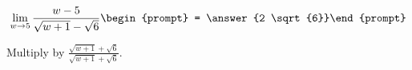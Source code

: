 \documentclass{ximera}
\author{Bart Snapp}
\begin{document}
\begin{exercise}

\[
\lim_{w\to 5 } \frac{w-5}{\sqrt{w+1}-\sqrt{6}}\begin{prompt} = \answer{2 \sqrt{6}}\end{prompt}
\]
\begin{hint}
Multiply by $\frac{\sqrt{w+1}+\sqrt{6}}{\sqrt{w+1}+\sqrt{6}}$.
\end{hint}
\end{exercise}
\end{document}

